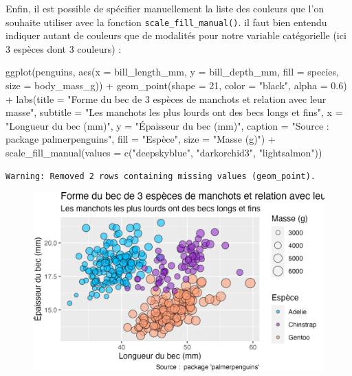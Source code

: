 \documentclass[
  letterpaper,
  DIV=11,
  numbers=noendperiod]{scrreprt}
\newenvironment{Shaded}{\begin{snugshade}}{\end{snugshade}}
\newcommand{\AttributeTok}[1]{\textcolor[rgb]{0.40,0.45,0.13}{#1}}
\newcommand{\DecValTok}[1]{\textcolor[rgb]{0.68,0.00,0.00}{#1}}
\newcommand{\FloatTok}[1]{\textcolor[rgb]{0.68,0.00,0.00}{#1}}
\newcommand{\FunctionTok}[1]{\textcolor[rgb]{0.28,0.35,0.67}{#1}}
\newcommand{\NormalTok}[1]{\textcolor[rgb]{0.00,0.23,0.31}{#1}}
\newcommand{\SpecialCharTok}[1]{\textcolor[rgb]{0.37,0.37,0.37}{#1}}
\newcommand{\StringTok}[1]{\textcolor[rgb]{0.13,0.47,0.30}{#1}}
\begin{document}
Enfin, il est possible de spécifier manuellement la liste des couleurs
que l'on souhaite utiliser avec la fonction
\texttt{scale\_fill\_manual()}. il faut bien entendu indiquer autant de
couleurs que de modalités pour notre variable catégorielle (ici 3
espèces dont 3 couleurs) :

\begin{Shaded}
\begin{Highlighting}[]
\FunctionTok{ggplot}\NormalTok{(penguins, }\FunctionTok{aes}\NormalTok{(}\AttributeTok{x =}\NormalTok{ bill\_length\_mm, }\AttributeTok{y =}\NormalTok{ bill\_depth\_mm,}
                     \AttributeTok{fill =}\NormalTok{ species, }\AttributeTok{size =}\NormalTok{ body\_mass\_g)) }\SpecialCharTok{+}
  \FunctionTok{geom\_point}\NormalTok{(}\AttributeTok{shape =} \DecValTok{21}\NormalTok{, }\AttributeTok{color =} \StringTok{"black"}\NormalTok{, }\AttributeTok{alpha =} \FloatTok{0.6}\NormalTok{) }\SpecialCharTok{+}
  \FunctionTok{labs}\NormalTok{(}\AttributeTok{title =} \StringTok{"Forme du bec de 3 espèces de manchots et relation avec leur masse"}\NormalTok{,}
       \AttributeTok{subtitle =} \StringTok{"Les manchots les plus lourds ont des becs longs et fins"}\NormalTok{,}
       \AttributeTok{x =} \StringTok{"Longueur du bec (mm)"}\NormalTok{,}
       \AttributeTok{y =} \StringTok{"Épaisseur du bec (mm)"}\NormalTok{,}
       \AttributeTok{caption =} \StringTok{"Source :  package \textquotesingle{}palmerpenguins\textquotesingle{}"}\NormalTok{,}
       \AttributeTok{fill =} \StringTok{"Espèce"}\NormalTok{,}
       \AttributeTok{size =} \StringTok{"Masse (g)"}\NormalTok{) }\SpecialCharTok{+}
  \FunctionTok{scale\_fill\_manual}\NormalTok{(}\AttributeTok{values =} \FunctionTok{c}\NormalTok{(}\StringTok{"deepskyblue"}\NormalTok{, }\StringTok{"darkorchid3"}\NormalTok{, }\StringTok{"lightsalmon"}\NormalTok{))}
\end{Highlighting}
\end{Shaded}

\begin{verbatim}
Warning: Removed 2 rows containing missing values (geom_point).
\end{verbatim}

\begin{figure}[H]

{\centering \includegraphics{./03-visualization_files/figure-pdf/unnamed-chunk-101-1.png}

}

\end{figure}
\end{document}
